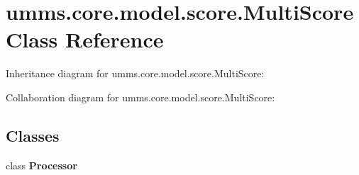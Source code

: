 \hypertarget{classumms_1_1core_1_1model_1_1score_1_1_multi_score}{\section{umms.\+core.\+model.\+score.\+Multi\+Score Class Reference}
\label{classumms_1_1core_1_1model_1_1score_1_1_multi_score}
}


Inheritance diagram for umms.\+core.\+model.\+score.\+Multi\+Score\+:


Collaboration diagram for umms.\+core.\+model.\+score.\+Multi\+Score\+:
\subsection*{Classes}
\begin{DoxyCompactItemize}
\item 
class {\bfseries Processor}
\end{DoxyCompactItemize}
